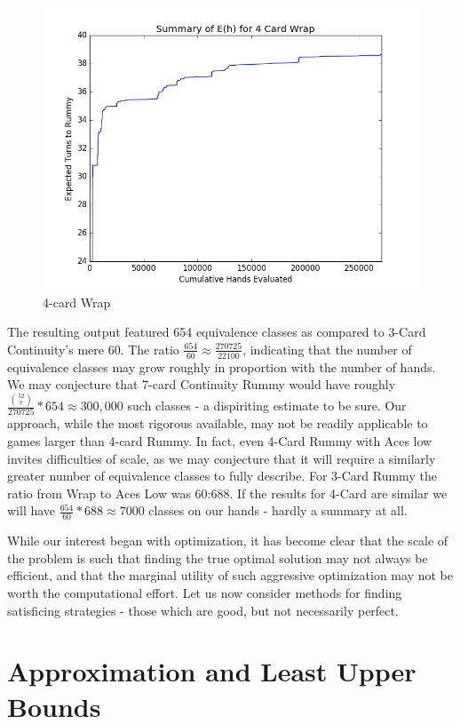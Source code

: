 \documentclass[paper=a4, fontsize=11pt,twoside]{report}   %
\begin{document}
\begin{figure}
\includegraphics[width=\textwidth]{fig3.png}
\caption{4-card Wrap}\label{fig:3}
\end{figure}

The resulting output featured 654 equivalence classes as compared to 3-Card Continuity's mere 60. The ratio $\frac{654}{60} \approx \frac{270725}{22100}$, indicating that the number of equivalence classes may grow roughly in proportion with the number of hands. We may conjecture that 7-card Continuity Rummy would have roughly $\frac{\binom{52}{7}}{270725} * 654 \approx 300,000$ such classes - a dispiriting estimate to be sure. Our approach, while the most rigorous available, may not be readily applicable to games larger than 4-card Rummy. In fact, even 4-Card Rummy with Aces low invites difficulties of scale, as we may conjecture that it will require a similarly greater number of equivalence classes to fully describe. For 3-Card Rummy the ratio from Wrap to Aces Low was 60:688. If the results for 4-Card are similar we will have $\frac{654}{60} * 688 \approx 7000$ classes on our hands - hardly a summary at all.

While our interest began with optimization, it has become clear that the scale of the problem is such that finding the true optimal solution may not always be efficient, and that the marginal utility of such aggressive optimization may not be worth the computational effort. Let us now consider methods for finding satisficing strategies - those which are good, but not necessarily perfect.

\chapter{Approximation and Least Upper Bounds}
\end{document}
